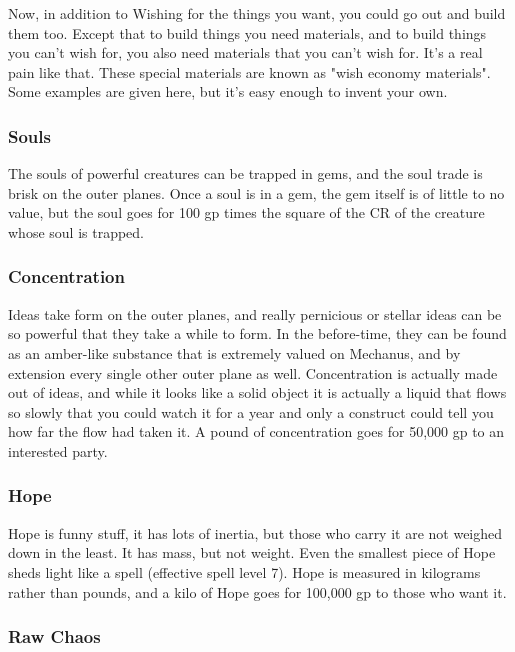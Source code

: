 Now, in addition to Wishing for the things you want, you could go out and build them too. Except that to build things you need materials, and to build things you can't wish for, you also need materials that you can't wish for. It's a real pain like that. These special materials are known as "wish economy materials". Some examples are given here, but it's easy enough to invent your own.

\subsubsection{Souls}

The souls of powerful creatures can be trapped in gems, and the soul trade is brisk on the outer planes. Once a soul is in a gem, the gem itself is of little to no value, but the soul goes for 100 gp times the square of the CR of the creature whose soul is trapped.

\subsubsection{Concentration}

Ideas take form on the outer planes, and really pernicious or stellar ideas can be so powerful that they take a while to form. In the before-time, they can be found as an amber-like substance that is extremely valued on Mechanus, and by extension every single other outer plane as well. Concentration is actually made out of ideas, and while it looks like a solid object it is actually a liquid that flows so slowly that you could watch it for a year and only a construct could tell you how far the flow had taken it. A pound of concentration goes for 50,000 gp to an interested party.

\subsubsection{Hope}

Hope is funny stuff, it has lots of inertia, but those who carry it are not weighed down in the least. It has mass, but not weight. Even the smallest piece of Hope sheds light like a  spell (effective spell level 7). Hope is measured in kilograms rather than pounds, and a kilo of Hope goes for 100,000 gp to those who want it.

\subsubsection{Raw Chaos}

